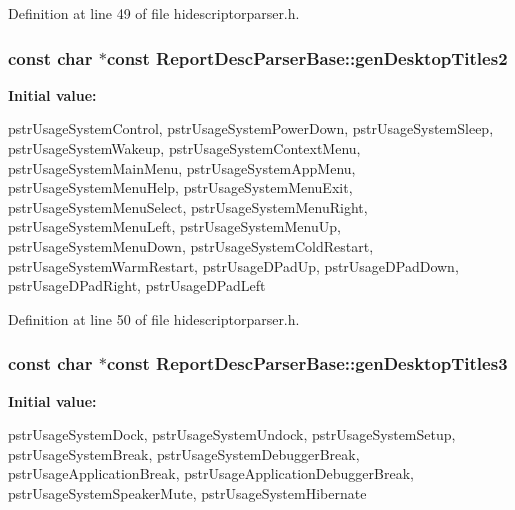 \-Definition at line 49 of file hidescriptorparser.\-h.

\hypertarget{class_report_desc_parser_base_a043e24aa742e9257202a2dc80725122c}{
\subsubsection[{gen\-Desktop\-Titles2}]{\setlength{\rightskip}{0pt plus 5cm}const char $\ast$const {\bf \-Report\-Desc\-Parser\-Base\-::gen\-Desktop\-Titles2}}}\label{class_report_desc_parser_base_a043e24aa742e9257202a2dc80725122c}
{\bfseries \-Initial value\-:}
\begin{DoxyCode}
 {
        pstrUsageSystemControl,
        pstrUsageSystemPowerDown,
        pstrUsageSystemSleep,
        pstrUsageSystemWakeup,
        pstrUsageSystemContextMenu,
        pstrUsageSystemMainMenu,
        pstrUsageSystemAppMenu,
        pstrUsageSystemMenuHelp,
        pstrUsageSystemMenuExit,
        pstrUsageSystemMenuSelect,
        pstrUsageSystemMenuRight,
        pstrUsageSystemMenuLeft,
        pstrUsageSystemMenuUp,
        pstrUsageSystemMenuDown,
        pstrUsageSystemColdRestart,
        pstrUsageSystemWarmRestart,
        pstrUsageDPadUp,
        pstrUsageDPadDown,
        pstrUsageDPadRight,
        pstrUsageDPadLeft
}
\end{DoxyCode}


\-Definition at line 50 of file hidescriptorparser.\-h.

\hypertarget{class_report_desc_parser_base_acef88e30e3582b47deecf615495a3e8d}{
\subsubsection[{gen\-Desktop\-Titles3}]{\setlength{\rightskip}{0pt plus 5cm}const char $\ast$const {\bf \-Report\-Desc\-Parser\-Base\-::gen\-Desktop\-Titles3}}}\label{class_report_desc_parser_base_acef88e30e3582b47deecf615495a3e8d}
{\bfseries \-Initial value\-:}
\begin{DoxyCode}
 {
        pstrUsageSystemDock,
        pstrUsageSystemUndock,
        pstrUsageSystemSetup,
        pstrUsageSystemBreak,
        pstrUsageSystemDebuggerBreak,
        pstrUsageApplicationBreak,
        pstrUsageApplicationDebuggerBreak,
        pstrUsageSystemSpeakerMute,
        pstrUsageSystemHibernate
}
\end{DoxyCode}



